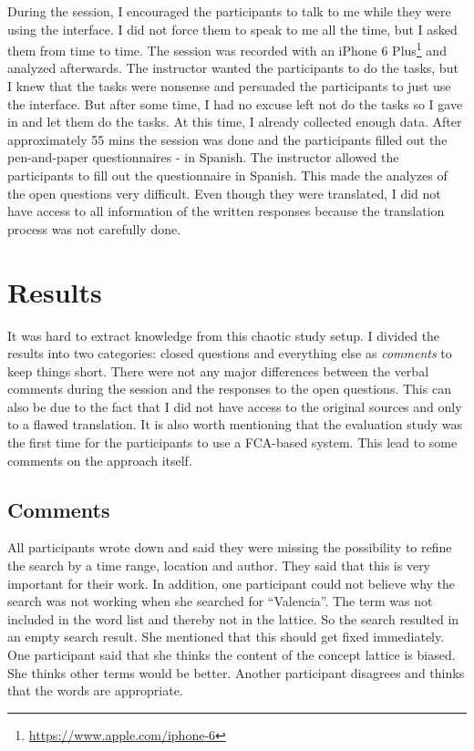 \documentclass[11pt]{report}
\begin{document}
During the session, I encouraged the participants to talk to me while they were using the interface. I did not force them to speak to me all the time, but I asked them from time to time. The session was recorded with an iPhone 6 Plus\footnote{\url{https://www.apple.com/iphone-6}} and analyzed afterwards. The instructor wanted the participants to do the tasks, but I knew that the tasks were nonsense and persuaded the participants to just use the interface. But after some time, I had no excuse left not do the tasks so I gave in and let them do the tasks. At this time, I already collected enough data. After approximately  55 mins the session was done and the participants filled out the pen-and-paper questionnaires - in Spanish. The instructor allowed the participants to fill out the questionnaire in Spanish. This made the analyzes of the open questions very difficult. Even though they were translated, I did not have access to all information of the written responses because the translation process was not carefully done.
\section{Results}

It was hard to extract knowledge from this chaotic study setup. I divided the results into two categories: closed questions and everything else as \textit{comments} to keep things short. There were not any major differences between the verbal comments during the session and the responses to the open questions. This can also be due to the fact that I did not have access to the original sources and only to a flawed translation. It is also worth mentioning that the evaluation study was the first time for the participants to use a FCA-based system. This lead to some comments on the approach itself.

\subsection{Comments}
All participants wrote down and said they were missing the possibility to refine the search by a time range, location and author. They said that this is very important for their work. In addition, one participant could not believe why the search was not working when she searched for ``Valencia''. The term was not included in the word list and thereby not in the lattice. So the search resulted in an empty search result. She mentioned that this should get fixed immediately. One participant said that she thinks the content of the concept lattice is biased. She thinks other terms would be better. Another participant disagrees and thinks that the words are appropriate. \\
\end{document}

